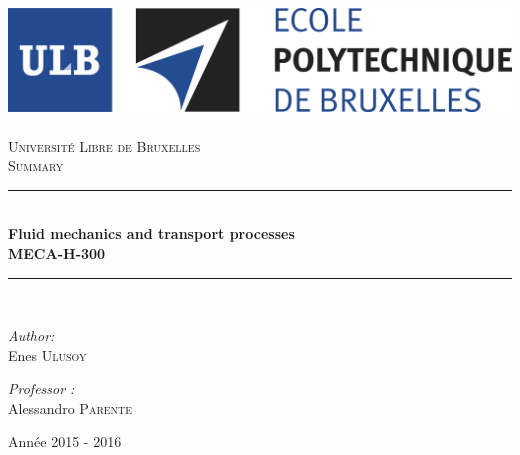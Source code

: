 \AddToShipoutPicture*{\BackgroundPic}
\begin{titlepage}
\begin{center}	
	
	\newcommand{\HRule}{\rule{\linewidth}{0.5mm}}   			            %
	\includegraphics[scale=0.11]{titlepage/logo.jpg}~\\[1cm]				%

	\textsc{\LARGE Université Libre de Bruxelles}\\[1.5cm]
	\textsc{\Large Summary}\\[0.5cm]

	\HRule \\[0.4cm]
	{\huge \bfseries Fluid mechanics and transport processes \ \\MECA-H-300 \\[0.4cm] }


	\HRule \\[1.5cm]
		\begin{minipage}{0.6\textwidth}
		\begin{flushleft} \large
		\emph{Author:}\\
		Enes \textsc{Ulusoy} \\
		\end{flushleft}
		\end{minipage}
		\begin{minipage}{0.25\textwidth}
	\large
		\emph{Professor :}\\
		Alessandro \textsc{Parente}
	\end{minipage}

	\vfill

{\large Année 2015 - 2016}

\end{center}
\end{titlepage}